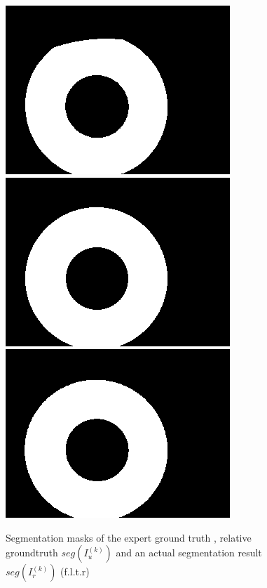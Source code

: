 \documentclass[10pt,twocolumn,letterpaper]{article}
\begin{document}
\begin{figure}
\begin{center}

  \includegraphics[width=0.3\linewidth]{img/segMasks/gt.png}
  \includegraphics[width=0.3\linewidth]{img/segMasks/jpg_caht_q100_cr5.png}
  \includegraphics[width=0.3\linewidth]{img/segMasks/jpg_wahet_q100_cr5.png}
  \end{center}
  
  \label{fig:segMasks}
  \caption{Segmentation masks of the expert ground truth \cite{severeCompression}, relative groundtruth $seg(I_u^{(k)})$ and an actual segmentation result $seg(I_r^{(k)})$ (f.l.t.r)}
\end{figure}

\end{document}
